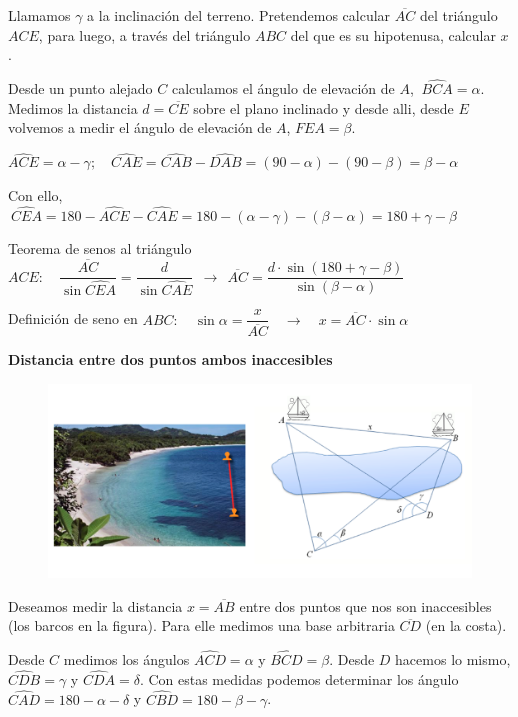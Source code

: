 Llamamos $\gamma$ a la inclinación del terreno. Pretendemos calcular $\overline{AC}$ del triángulo $ACE$, para luego, a través del triángulo $ABC$ del que es su hipotenusa, calcular $x$.

Desde un punto alejado $C$ calculamos el ángulo de elevación de $A$, $\ \widehat{BCA}=\alpha$. Medimos la distancia $d=\overline{CE}$ sobre el plano inclinado y desde alli, desde $E$ volvemos a medir el ángulo de elevación de $A$, $\widehat{FEA}=\beta$.

 $\widehat{ACE}=\alpha-\gamma;\quad \widehat{CAE}=\widehat{CAB}-\widehat{DAB}=(90-\alpha)-(90-\beta)=\beta-\alpha$
 
 Con ello, $\ \widehat{CEA}=180-\widehat{ACE}-\widehat{CAE}=180-(\alpha-\gamma)-(\beta-\alpha)=180+\gamma-\beta$
 
 Teorema de senos al triángulo $ACE:\quad \dfrac{\overline{AC}}{\sin \widehat{CEA}}=\dfrac{d}{\sin \widehat{CAE}} \ \ \to \ \ \overline{AC}=\dfrac{d\cdot \sin(180+\gamma-\beta)}{\sin(\beta-\alpha)}$
 
 Definición de seno en $ABC:\quad \sin \alpha=\dfrac{x}{\overline{AC}} \quad \to \quad x=\overline{AC}\cdot \sin \alpha$

\vspace{8mm}
\begin{large}
\textbf{Distancia entre dos puntos ambos inaccesibles}	
\end{large}

\begin{figure}[H]
	\centering
	\includegraphics[width=.9\textwidth]{img-triang/topog06.png}
\end{figure}

Deseamos medir la distancia $x=\overline{AB}$ entre dos puntos que nos son inaccesibles (los barcos en la figura). Para elle medimos una base arbitraria $\overline{CD}$ (en la costa).

Desde $C$ medimos los ángulos $\widehat{ACD}=\alpha$ y $\widehat{BCD}=\beta$. Desde $D$ hacemos lo mismo, $\widehat{CDB}=\gamma$ y $\widehat{CDA}=\delta$. Con estas medidas podemos determinar los ángulo $\widehat{CAD}=180-\alpha-\delta$ y $\widehat{CBD}=180-\beta-\gamma$.

